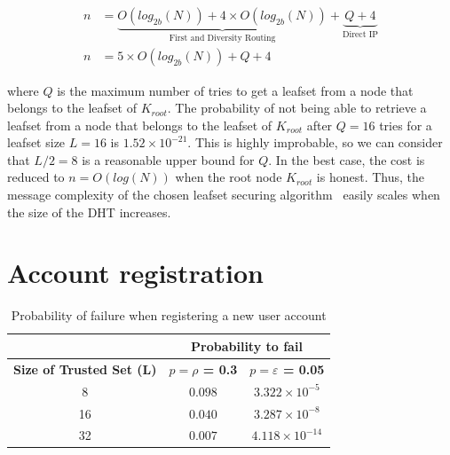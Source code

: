       \begin{align} \label{eq:p_leafset}
        n &= \underbrace{O(log_{2b}(N)) + 4 \times O(log_{2b}(N))}_\text{First
and Diversity Routing} + \underbrace{Q+4}_\text{Direct IP} \\
        n &= 5 \times O(log_{2b}(N)) +  Q+4 
      \end{align}
      
      where $Q$ is the maximum number of tries to get a leafset from a node
that belongs to the leafset of $K_{root}$. The probability of not being able to
retrieve a leafset from a node that belongs to the leafset of $K_{root}$ after
$Q = 16$ tries for a leafset size $ L = 16$ is $1.52 \times 10^{-21} $. This is
highly improbable, so we can consider that $L/2 = 8$ is a reasonable upper
bound for $Q$. 
      In the best case, the cost is reduced to $n = O(log(N))$ when the root
node $K_{root}$ is honest. Thus, the message complexity of the chosen leafset
securing algorithm~\cite{p2p_certification} easily scales when the size of the
DHT increases.





%

\section{Account registration}
\label{sec:eval_account_registration}
  \begin{table}
    \centering
    \footnotesize
    \begin{tabular}{|c|c|c|}
      \cline{2-3}
      \multicolumn{1}{c|}{}&  \multicolumn{2}{c|}{\textbf{Probability to fail}} \\ \cline{2-3}
      \hline
      \textbf{Size of Trusted Set (L)} & \textbf{$p = \rho$ = 0.3} & \textbf{$p = \varepsilon$ = 0.05} \\
      \hline \hline

      8 &  $0.098$ & $3.322 \times 10^{-5}$ \\
      \hline
      16 & $0.040$ & $3.287 \times 10^{-8}$  \\
      \hline
      32 & $0.007$ & $4.118 \times 10^{-14}$  \\
      \hline
    \end{tabular}
    \caption{Probability of failure when registering a new user account}
    \label{tab:p_account_registration}
  \end{table}
  
